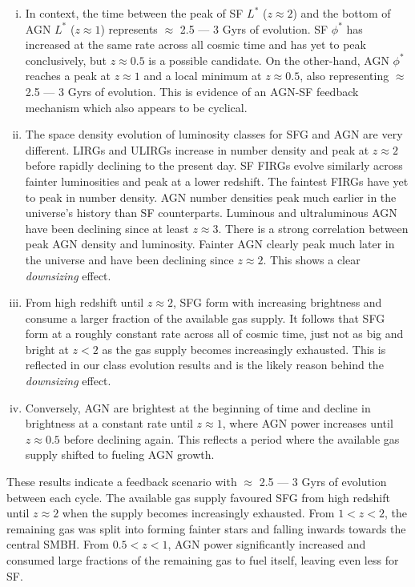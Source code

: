 \begin{enumerate}[(i)]
    \item In context, the time between the peak of SF $L^{*}$ ($z\approx2$) and the bottom of AGN $L^{*}$ ($z\approx1$) represents $\approx$ 2.5 --- 3 Gyrs of evolution. SF $\phi^{*}$ has increased at the same rate across all cosmic time and has yet to peak conclusively, but $z\approx0.5$ is a possible candidate. On the other-hand, AGN $\phi^{*}$ reaches a peak at $z\approx1$ and a local minimum at $z\approx0.5$, also representing $\approx$ 2.5 --- 3 Gyrs of evolution. This is evidence of an AGN-SF feedback mechanism which also appears to be cyclical. 

    \item The space density evolution of luminosity classes for SFG and AGN are very different. LIRGs and ULIRGs increase in number density and peak at $z \approx 2$ before rapidly declining to the present day. SF FIRGs evolve similarly across fainter luminosities and peak at a lower redshift. The faintest FIRGs have yet to peak in number density. AGN number densities peak much earlier in the universe's history than SF counterparts. Luminous and ultraluminous AGN have been declining since at least $z \approx 3$. There is a strong correlation between peak AGN density and luminosity. Fainter AGN clearly peak much later in the universe and have been declining since $z \approx 2$. This shows a clear \textit{downsizing} effect.

    \item From high redshift until $z\approx2$, SFG form with increasing brightness and consume a larger fraction of the available gas supply. It follows that SFG form at a roughly constant rate across all of cosmic time, just not as big and bright at $z<2$ as the gas supply becomes increasingly exhausted. This is reflected in our class evolution results and is the likely reason behind the \textit{downsizing} effect.

    \item Conversely, AGN are brightest at the beginning of time and decline in brightness at a constant rate until $z\approx1$, where AGN power increases until $z\approx0.5$ before declining again. This reflects a period where the available gas supply shifted to fueling AGN growth.
\end{enumerate}

These results indicate a feedback scenario with $\approx$ 2.5 --- 3 Gyrs of evolution between each cycle. The available gas supply favoured SFG from high redshift until $z\approx2$ when the supply becomes increasingly exhausted. From $1<z<2$, the remaining gas was split into forming fainter stars and falling inwards towards the central SMBH. From $0.5<z<1$, AGN power significantly increased and consumed large fractions of the remaining gas to fuel itself, leaving even less for SF. 

